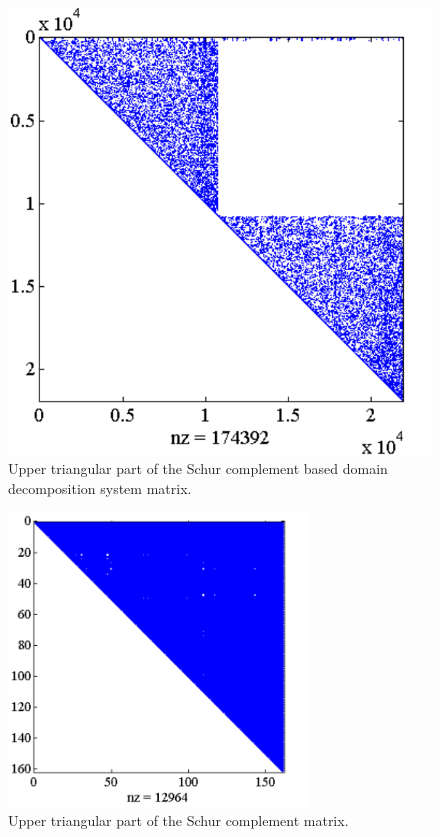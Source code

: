 \begin{figure}[ht!]
\centering
\includegraphics[width=12cm]{DDSchurMat}
\caption{Upper triangular part of the Schur complement based domain decomposition system matrix.}
\label{fig:DDSchurMat}
\end{figure}

\begin{figure}[ht!]
\centering
\includegraphics[width=8cm]{DDSchurMatS}
\caption{Upper triangular part of the Schur complement matrix.}
\label{fig:DDSchurMatS}
\end{figure}

